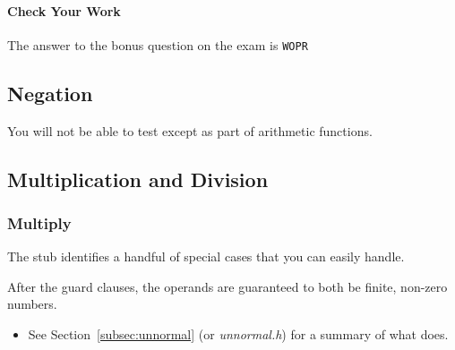 \paragraph*{Check Your Work}

\begin{description}
\end{description}
The answer to the bonus question on the exam is \texttt{WOPR}


\subsection{Negation}

\begin{description}
\end{description}

You will not be able to test  except as part of arithmetic functions.



\subsection{Multiplication and Division}

\subsubsection{Multiply}

The  stub identifies a handful of special cases that you can easily handle.
\begin{description}
\end{description}

After the guard clauses, the operands are guaranteed to both be finite, non-zero numbers.

\begin{description}
    \begin{itemize}
        \item See Section~\ref{subsec:unnormal} (or \textit{unnormal.h}) for a summary of what  does.
    \end{itemize}
\end{description}

